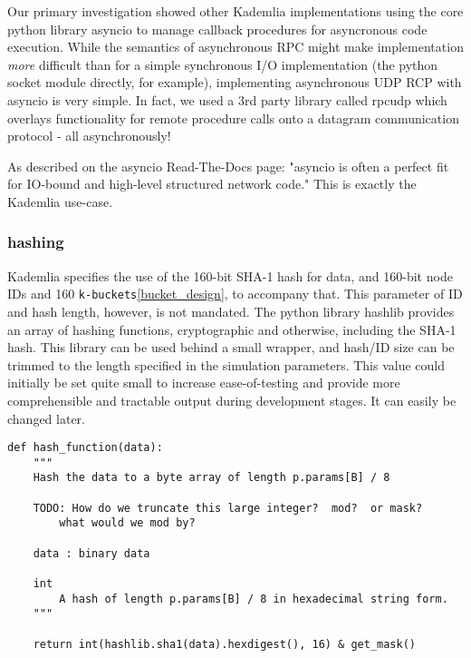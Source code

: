 \documentclass[12pt]{report}
\newcommand{\code}[1]{\colorbox{codegray}{\texttt{#1}}}
\begin{document}
                Our primary investigation showed other Kademlia
                implementations using the core python library asyncio to manage
                callback procedures for asyncronous code execution. While the
                semantics of asynchronous RPC might make implementation
                \textit{more} difficult than for a simple synchronous I/O
                implementation (the python socket module directly, for
                example), implementing asynchronous UDP RCP with asyncio is
                very simple.  In fact, we used a 3rd party library called
                rpcudp which overlays functionality for remote procedure calls
                onto a datagram communication protocol - all
                asynchronously!\cite{rpcudp}

                As described on the asyncio Read-The-Docs page: "asyncio is
                often a perfect fit for IO-bound and high-level structured
                network code." This is exactly the Kademlia
                use-case.\cite{asyncio}

            \subsubsection{hashing}
                Kademlia specifies the use of the 160-bit SHA-1 hash for data,
                and 160-bit node IDs and 160
                \code{k-buckets}\ref{bucket_design}, to accompany that.
                This parameter of ID and hash length, however, is not mandated.
                The python library hashlib provides an array of hashing
                functions, cryptographic and otherwise, including the SHA-1
                hash.  This library can be used behind a small wrapper, and
                hash/ID size can be trimmed to the length specified in the
                simulation parameters.  This value could initially be set quite
                small to increase ease-of-testing and provide more
                comprehensible and tractable output during development stages.
                It can easily be changed later.
\begin{lstlisting}[label=hashing]
def hash_function(data):
    """
    Hash the data to a byte array of length p.params[B] / 8

    TODO: How do we truncate this large integer?  mod?  or mask?
        what would we mod by?

    data : binary data
    
    int 
        A hash of length p.params[B] / 8 in hexadecimal string form.
    """
        
    return int(hashlib.sha1(data).hexdigest(), 16) & get_mask() 
\end{lstlisting}
            
\end{document}
